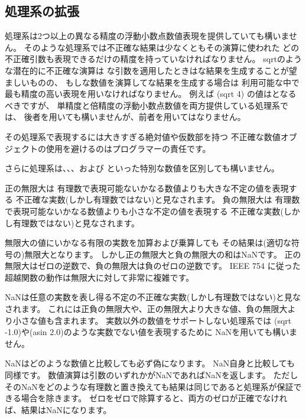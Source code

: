 \subsection{処理系の拡張}

\vest 処理系は2つ以上の異なる精度の浮動小数点数値表現を提供していても構いません。
そのような処理系では不正確な結果は少なくともその演算に使われた
どの不正確引数も表現できるだけの精度を持っていなければなりません。
{\cf sqrt}のような潜在的に不正確な演算は
な引数を適用したときはな結果を生成することが望ましいものの、
もしな数値を演算してな結果を生成する場合は
利用可能な中で最も精度の高い表現を用いなければなりません。
例えば {\cf (sqrt 4)} の値は{}となるべきですが、
単精度と倍精度の浮動小数点数値を両方提供している処理系では、
後者を用いても構いませんが、前者を用いてはなりません。

その処理系で表現するには大きすぎる絶対値や仮数部を持つ
不正確な数値オブジェクトの使用を避けるのはプログラマーの責任です。

さらに処理系は、、、および
といった特別な数値を区別しても構いません。

正の無限大は
有理数で表現可能ないかなる数値よりも大きな不定の値を表現する
不正確な実数(しかし有理数ではない)と見なされます。
負の無限大は
有理数で表現可能ないかなる数値よりも小さな不定の値を表現する
不正確な実数(しかし有理数ではない)と見なされます。

無限大の値にいかなる有限の実数を加算および乗算しても
その結果は(適切な符号の)無限大となります。
しかし正の無限大と負の無限大の和はNaNです。
正の無限大はゼロの逆数で、負の無限大は負のゼロの逆数です。
IEEE 754 に従った超越関数の動作は無限大に対して非常に複雑です。

NaNは任意の実数を表し得る不定の不正確な実数(しかし有理数ではない)と見なされます。
これには正負の無限大や、正の無限大より大きな値、負の無限大より小さな値も含まれます。
実数以外の数値をサポートしない処理系では
{\cf (sqrt -1.0)}や{\cf (asin 2.0)}のような実数でない値を表現するために
NaNを用いても構いません。

NaNはどのような数値と比較しても必ず偽になります。
NaN自身と比較しても同様です。
数値演算は引数のいずれかがNaNであればNaNを返します。
ただしそのNaNをどのような有理数と置き換えても結果は同じであると処理系が保証できる場合を除きます。
ゼロをゼロで除算すると、両方のゼロが正確でなければ、結果はNaNになります。


